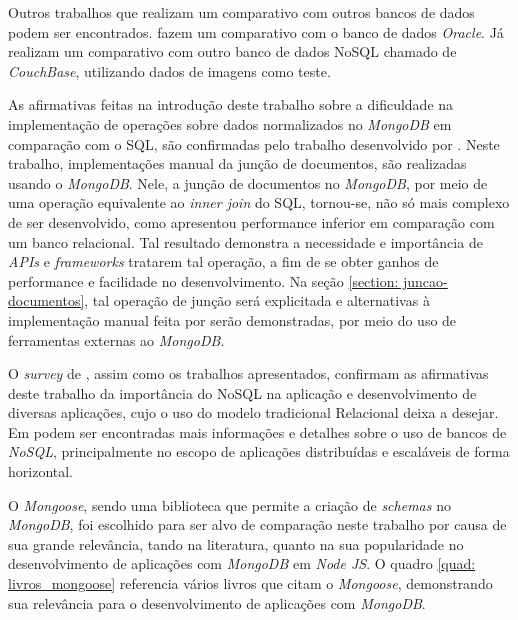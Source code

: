 Outros trabalhos que realizam um comparativo com outros bancos de dados podem ser encontrados.  fazem um comparativo com o banco de dados \textit{Oracle}. Já  realizam um comparativo com outro banco de dados NoSQL chamado de \textit{CouchBase}, utilizando dados de imagens como teste.

As afirmativas feitas na introdução deste trabalho sobre a dificuldade na implementação de operações sobre dados normalizados no \textit{MongoDB} em comparação com o SQL, são confirmadas pelo trabalho desenvolvido por . Neste trabalho, implementações manual da junção de documentos, são realizadas usando o \textit{MongoDB}. Nele, a junção de documentos no \textit{MongoDB}, por meio de uma operação equivalente ao \textit{inner join} do SQL, tornou-se, não só mais complexo de ser desenvolvido, como apresentou performance inferior em comparação com um banco relacional. Tal resultado demonstra a necessidade e importância de \textit{APIs} e \textit{frameworks} tratarem tal operação, a fim de se obter ganhos de performance e facilidade no desenvolvimento. Na seção \ref{section: juncao-documentos}, tal operação de junção será explicitada e alternativas à implementação manual feita por  serão demonstradas, por meio do uso de ferramentas externas ao \textit{MongoDB}.

O \textit{survey} de , assim como os trabalhos apresentados, confirmam as afirmativas deste trabalho da importância do NoSQL na aplicação e desenvolvimento de diversas aplicações, cujo o uso do modelo tradicional Relacional deixa a desejar. Em  podem ser encontradas mais informações e detalhes sobre o uso de bancos de \textit{NoSQL}, principalmente no escopo de aplicações distribuídas e escaláveis de forma horizontal.

O \textit{Mongoose}, sendo uma biblioteca que permite a criação de \textit{schemas} no \textit{MongoDB}, foi escolhido para ser alvo de comparação neste trabalho por causa de sua grande relevância, tando na literatura, quanto na sua popularidade no desenvolvimento de aplicações com \textit{MongoDB} em \textit{Node JS}. O quadro \ref{quad: livros_mongoose} referencia vários livros que citam o \textit{Mongoose}, demonstrando sua relevância para o desenvolvimento de aplicações com \textit{MongoDB}.

